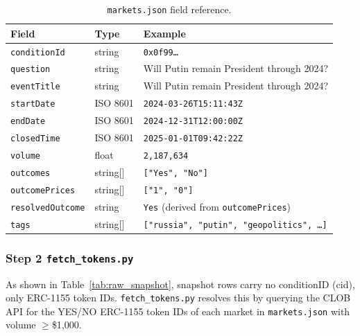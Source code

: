 \documentclass[11pt]{article}
\begin{document}
\begin{table}[H]
\centering
\caption{\texttt{markets.json} field reference.}
\label{tab:markets_schema}
\small
\begin{tabularx}{\textwidth}{l l X}
\toprule
\textbf{Field} & \textbf{Type} & \textbf{Example} \\
\midrule
\texttt{conditionId}     & string   & \texttt{0x0f99\ldots} \\
\texttt{question}        & string   & Will Putin remain President through 2024? \\
\texttt{eventTitle}      & string   & Will Putin remain President through 2024? \\
\texttt{startDate}       & ISO 8601 & \texttt{2024-03-26T15:11:43Z} \\
\texttt{endDate}         & ISO 8601 & \texttt{2024-12-31T12:00:00Z} \\
\texttt{closedTime}      & ISO 8601 & \texttt{2025-01-01T09:42:22Z} \\
\texttt{volume}          & float    & \texttt{2{,}187{,}634} \\
\texttt{outcomes}        & string[] & \texttt{["Yes", "No"]} \\
\texttt{outcomePrices}   & string[] & \texttt{["1", "0"]} \\
\texttt{resolvedOutcome} & string   & \texttt{Yes} (derived from \texttt{outcomePrices}) \\
\texttt{tags}            & string[] & \texttt{["russia", "putin", "geopolitics", \ldots]} \\
\bottomrule
\end{tabularx}
\end{table}





\subsubsection*{Step 2 \texttt{fetch\_tokens.py}}

As shown in Table~\ref{tab:raw_snapshot}, snapshot rows carry no 
conditionID (cid), only ERC-1155 token IDs. \texttt{fetch\_tokens.py} 
resolves this by querying the CLOB API for the YES/NO ERC-1155 token IDs of 
each market in \texttt{markets.json} with volume $\geq$\$1{,}000. 
\end{document}
